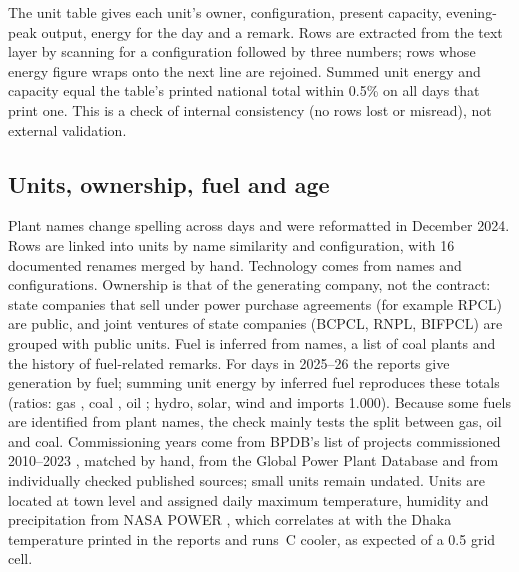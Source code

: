\documentclass[11pt]{article}
\begin{document}
The unit table gives each unit's owner, configuration, present capacity, evening-peak output, energy for the day and a remark. Rows are extracted from the text layer by scanning for a configuration followed by three numbers; rows whose energy figure wraps onto the next line are rejoined. Summed unit energy and capacity equal the table's printed national total within 0.5\% on all \nCheckDays{} days that print one. This is a check of internal consistency (no rows lost or misread), not external validation.

\subsection{Units, ownership, fuel and age}
Plant names change spelling across days and were reformatted in December 2024. Rows are linked into \nUnits{} units by name similarity and configuration, with 16 documented renames merged by hand. Technology comes from names and configurations. Ownership is that of the generating company, not the contract: state companies that sell under power purchase agreements (for example RPCL) are public, and joint ventures of state companies (BCPCL, RNPL, BIFPCL) are grouped with public units. Fuel is inferred from names, a list of coal plants and the history of fuel-related remarks. For \fuelDays{} days in 2025--26 the reports give generation by fuel; summing unit energy by inferred fuel reproduces these totals (ratios: gas \fuelGas, coal \fuelCoal, oil \fuelOil; hydro, solar, wind and imports 1.000). Because some fuels are identified from plant names, the check mainly tests the split between gas, oil and coal. Commissioning years come from BPDB's list of projects commissioned 2010--2023 \citep{bpdb2023annual}, matched by hand, from the Global Power Plant Database \citep{wri2021gppd} and from individually checked published sources; \nUndated{} small units remain undated. Units are located at town level and assigned daily maximum temperature, humidity and precipitation from NASA POWER \citep{nasapower}, which correlates at \dhakaR{} with the Dhaka temperature printed in the reports and runs \dhakaBias\,\textdegree C cooler, as expected of a 0.5\textdegree{} grid cell.
\end{document}
